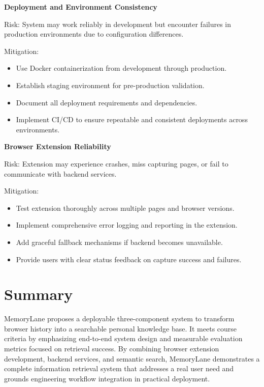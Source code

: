 \documentclass[11pt,a4paper]{article}
\begin{document}
\textbf{Deployment and Environment Consistency}

Risk: System may work reliably in development but encounter failures in production environments due to configuration differences.

Mitigation:

\begin{itemize}[leftmargin=0.7cm]

\item Use Docker containerization from development through production.

\item Establish staging environment for pre-production validation.

\item Document all deployment requirements and dependencies.

\item Implement CI/CD to ensure repeatable and consistent deployments across environments.

\end{itemize}


\textbf{Browser Extension Reliability}

Risk: Extension may experience crashes, miss capturing pages, or fail to communicate with backend services.

Mitigation:

\begin{itemize}[leftmargin=0.7cm]

\item Test extension thoroughly across multiple pages and browser versions.

\item Implement comprehensive error logging and reporting in the extension.

\item Add graceful fallback mechanisms if backend becomes unavailable.

\item Provide users with clear status feedback on capture success and failures.

\end{itemize}


\section{Summary}

MemoryLane proposes a deployable three-component system to transform browser history into a searchable personal knowledge base. It meets course criteria by emphasizing end-to-end system design and measurable evaluation metrics focused on retrieval success. By combining browser extension development, backend services, and semantic search, MemoryLane demonstrates a complete information retrieval system that addresses a real user need and grounds engineering workflow integration in practical deployment.
\end{document}
